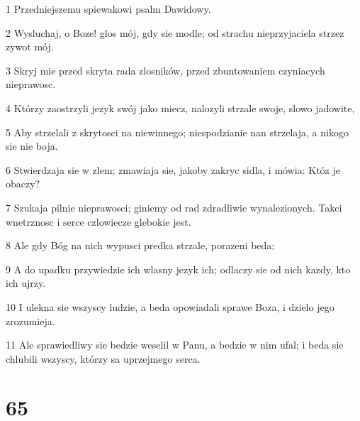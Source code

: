 \par 1 Przedniejszemu spiewakowi psalm Dawidowy.
\par 2 Wysluchaj, o Boze! glos mój, gdy sie modle; od strachu nieprzyjaciela strzez zywot mój.
\par 3 Skryj mie przed skryta rada zlosników, przed zbuntowaniem czyniacych nieprawosc.
\par 4 Którzy zaostrzyli jezyk swój jako miecz, nalozyli strzale swoje, slowo jadowite,
\par 5 Aby strzelali z skrytosci na niewinnego; niespodzianie nan strzelaja, a nikogo sie nie boja.
\par 6 Stwierdzaja sie w zlem; zmawiaja sie, jakoby zakryc sidla, i mówia: Któz je obaczy?
\par 7 Szukaja pilnie nieprawosci; giniemy od rad zdradliwie wynalezionych. Takci wnetrznosc i serce czlowiecze glebokie jest.
\par 8 Ale gdy Bóg na nich wypusci predka strzale, porazeni beda;
\par 9 A do upadku przywiedzie ich wlasny jezyk ich; odlaczy sie od nich kazdy, kto ich ujrzy.
\par 10 I ulekna sie wszyscy ludzie, a beda opowiadali sprawe Boza, i dzielo jego zrozumieja.
\par 11 Ale sprawiedliwy sie bedzie weselil w Panu, a bedzie w nim ufal; i beda sie chlubili wszyscy, którzy sa uprzejmego serca.

\chapter{65}

